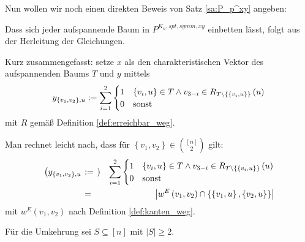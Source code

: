 \documentclass[10p,a4paper,BCOR = 12mm, DIV=15]{scrbook}
\begin{document}
{\label{sec:P_p^xy_direkt}

Nun wollen wir noch einen direkten Beweis von Satz \ref{sa:P_p^xy} angeben:

\begin{bew}
Dass sich jeder aufspannende Baum in $P^{K_n, spt, symm, xy}$ einbetten lässt, folgt aus der Herleitung der Gleichungen.

Kurz zusammengefasst: setze $x$ als den charakteristischen Vektor des aufspannenden Baums $T$ und $y$ mittels
\begin{displaymath}
y_{\left\{v_1, v_2\right\}, u} := \sum_{i=1}^2 \begin{cases}
1 & \left\{v_i, u\right\} \in T \wedge v_{3-i}\in R_{T\backslash \left\{\left\{v_i, u\right\}\right\}}\left(u\right) \\
0 & \textnormal{sonst}
\end{cases}
\end{displaymath}
mit $R$ gemäß Definition \ref{def:erreichbar_weg}.

\begin{Bem}
Man rechnet leicht nach, dass für $\left\{v_1, v_2\right\} \in {\left[n\right] \choose 2}$ gilt:
\begin{eqnarray*}
\left(y_{\left\{v_1, v_2\right\}, u} \right. & :=\left.\right) &  \sum_{i=1}^2 \begin{cases}
1 & \left\{v_i, u\right\} \in T \wedge v_{3-i}\in R_{T\backslash \left\{\left\{v_i, u\right\}\right\}}\left(u\right) \\
0 & \textnormal{sonst}
\end{cases} \\
& = & \left|w^E\left(v_1, v_2\right) \cap \left\{\left\{v_1, u\right\}, \left\{v_2, u\right\}\right\}\right|
\end{eqnarray*}
mit $w^E\left(v_1, v_2\right)$ nach Definition \ref{def:kanten_weg}.
\end{Bem}

Für die Umkehrung sei $S\subseteq \left[n\right]$ mit $\left|S\right| \geq 2$.


\end{bew}}
\end{document}
